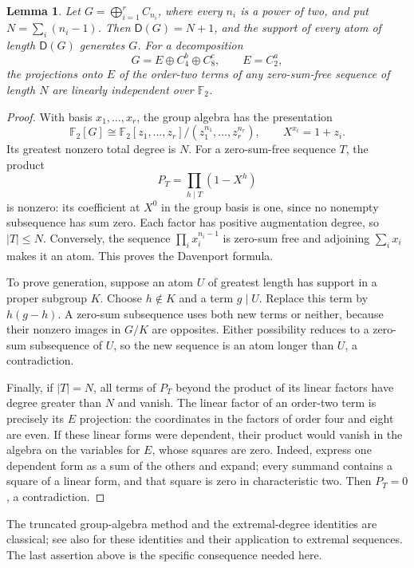 \documentclass[11pt]{article}
\newtheorem{lemma}[theorem]{Lemma}
\theoremstyle{definition}
\newcommand{\D}{\mathsf D}
\newcommand{\FF}{\mathbb F_2}
\begin{document}
\begin{lemma}\label{lem:extremal}
Let $G=\bigoplus_{i=1}^r C_{n_i}$, where every $n_i$ is a power of two, and put $N=\sum_i(n_i-1)$.
Then $\D(G)=N+1$, and the support of every atom of length $\D(G)$ generates $G$.
For a decomposition
\[
 G=E\oplus C_4^b\oplus C_8^c,\qquad E=C_2^a,
\]
the projections onto $E$ of the order-two terms of any zero-sum-free sequence of length $N$ are linearly independent over $\FF$.
\end{lemma}
\begin{proof}
With basis $x_1,\ldots,x_r$, the group algebra has the presentation
\[
 \FF[G]\cong\FF[z_1,\ldots,z_r]/(z_1^{n_1},\ldots,z_r^{n_r}),
 \qquad X^{x_i}=1+z_i.
\]
Its greatest nonzero total degree is $N$. For a zero-sum-free sequence $T$, the product
\[
 P_T=\prod_{h\mid T}(1-X^h)
\]
is nonzero: its coefficient at $X^0$ in the group basis is one, since no nonempty subsequence has sum zero. Each factor has positive augmentation degree, so $|T|\leq N$. Conversely, the sequence $\prod_i x_i^{n_i-1}$ is zero-sum free and adjoining $\sum_i x_i$ makes it an atom. This proves the Davenport formula.

To prove generation, suppose an atom $U$ of greatest length has support in a proper subgroup $K$. Choose $h\notin K$ and a term $g\mid U$. Replace this term by $h(g-h)$. A zero-sum subsequence uses both new terms or neither, because their nonzero images in $G/K$ are opposites. Either possibility reduces to a zero-sum subsequence of $U$, so the new sequence is an atom longer than $U$, a contradiction.

Finally, if $|T|=N$, all terms of $P_T$ beyond the product of its linear factors have degree greater than $N$ and vanish. The linear factor of an order-two term is precisely its $E$ projection: the coordinates in the factors of order four and eight are even. If these linear forms were dependent, their product would vanish in the algebra on the variables for $E$, whose squares are zero. Indeed, express one dependent form as a sum of the others and expand; every summand contains a square of a linear form, and that square is zero in characteristic two. Then $P_T=0$, a contradiction.
\end{proof}

The truncated group-algebra method and the extremal-degree identities are classical; see also \cite[Lemma 3.4]{GY} for these identities and their application to extremal sequences. The last assertion above is the specific consequence needed here.
\end{document}
